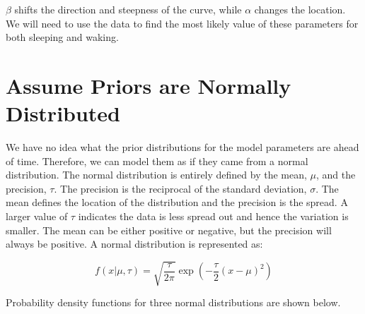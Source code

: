 \documentclass[12pt]{article}
\begin{document}
    \(\beta\) shifts the direction and steepness of the curve, while
\(\alpha\) changes the location. We will need to use the data to find
the most likely value of these parameters for both sleeping and waking.

    \hypertarget{assume-priors-are-normally-distributed}{%
\section{Assume Priors are Normally
Distributed}\label{assume-priors-are-normally-distributed}}

We have no idea what the prior distributions for the model parameters
are ahead of time. Therefore, we can model them as if they came from a
normal distribution. The normal distribution is entirely defined by the
mean, \(\mu\), and the precision, \(\tau\). The precision is the
reciprocal of the standard deviation, \(\sigma\). The mean defines the
location of the distribution and the precision is the spread. A larger
value of \(\tau\) indicates the data is less spread out and hence the
variation is smaller. The mean can be either positive or negative, but
the precision will always be positive. A normal distribution is
represented as:

\[ f(x | \mu, \tau) = \sqrt{\frac{\tau}{2\pi}} \exp\left( -\frac{\tau}{2} (x - \mu)^2 \right) \]

    Probability density functions for three normal distributions are shown
below.
\end{document}
